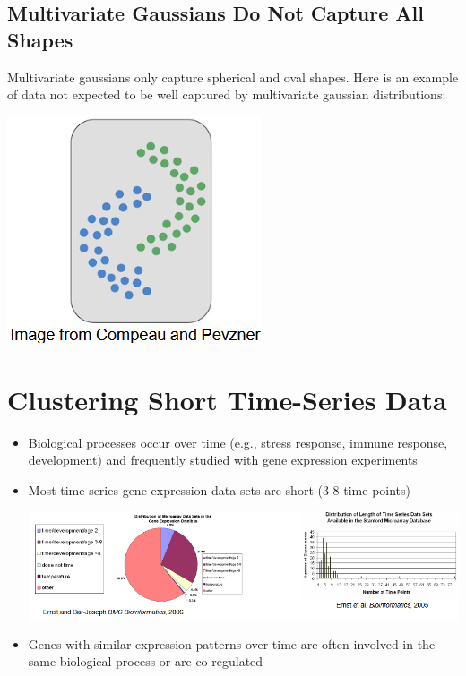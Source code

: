 \documentclass[10pt]{article}
\begin{document}
\subsection*{Multivariate Gaussians Do Not Capture All Shapes}
Multivariate gaussians only capture spherical and oval shapes.  Here is an example of data not expected to be well captured by multivariate gaussian distributions:
\begin{center}
    \includegraphics*[scale=0.9]{W6_39.png}
\end{center}

\section*{Clustering Short Time-Series Data}
\begin{itemize}
    \item Biological processes occur over time (e.g., stress response, immune response, development) and frequently studied with gene expression experiments
    \item Most time series gene expression data sets are short (3-8 time points)
    \begin{center}
        \includegraphics*[width=\textwidth]{W6_40.png}
    \end{center}
    \item Genes with similar expression patterns over time are often involved in the same biological process or are co-regulated
\end{itemize}
\end{document}
